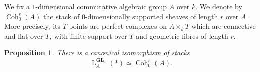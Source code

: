 \documentclass[12pt, oneside]{amsart}
\numberwithin{equation}{section}
\newtheorem{proposition}[subsubsection]{Proposition}
\theoremstyle{remark}
\theoremstyle{plain}
\newcommand{\Loop}{\operatorname{L}}
\newcommand{\GL}{\mathbf{GL}}
\begin{document}
\subsubsection{}

We fix a $1$-dimensional commutative algebraic group $A$ over $k$.
We denote by $\operatorname{Coh}_0^r(A)$ the stack of $0$-dimensionally supported sheaves of length $r$ over $A$.
More precisely, its $T$-points are perfect complexes on $A\times_k T$ which are connective and flat over $T$, with finite support over $T$ and geometric fibres of length $r$.

\begin{proposition}\label{prop:LA(BGLr) char 0}
There is a canonical isomorphism of stacks
\[
  \Loop_A^{\GL_r}(*) \simeq \operatorname{Coh}_0^r(A).
\]
\end{proposition}
\end{document}
